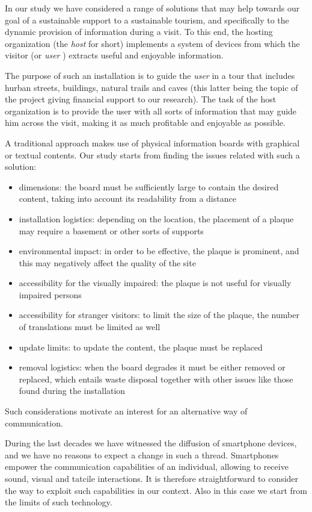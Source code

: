 \documentclass[sustainability,article,submit,pdftex,moreauthors]{Definitions/mdpi}
\begin{document}
In our study we have considered a range of solutions that may help towards our goal of a sustainable support to a sustainable tourism, and specifically to the dynamic provision of information during a visit. To this end, the hosting organization (the {\em host} for short) implements a system of devices from which the visitor (or {\em user} ) extracts useful and enjoyable information. 

The purpose of such an installation is to guide the {\em user} in a tour that includes hurban streets, buildings, natural trails and caves (this latter being the topic of the project giving financial support to our research). The task of the host organization is to provide the user with all sorts of information that may guide him across the visit, making it as much profitable and enjoyable as possible.

A traditional approach makes use of physical information boards with graphical or textual contents. Our study starts from finding the issues related with such a solution:

\begin{itemize}
\item dimensions: the board must be sufficiently large to contain the desired content, taking into account its readability from a distance
\item installation logistics: depending on the location, the placement of a plaque may require a basement or other sorts of supports
\item environmental impact: in order to be effective, the plaque is prominent, and this may negatively affect the quality of the site 
\item accessibility for the visually impaired: the plaque is not useful for visually impaired persons
\item accessibility for stranger visitors: to limit the size of the plaque, the number of translations must be limited as well
\item update limits: to update the content, the plaque must be replaced
\item removal logistics: when the board degrades it must be either removed or replaced, which entails waste disposal together with other issues like those found during the installation
\end{itemize}

Such considerations motivate an interest for an alternative way of communication. 

During the last decades we have witnessed the diffusion of smartphone devices, and we have no reasons to expect a change in such a thread. Smartphones empower the communication capabilities of an individual, allowing to receive sound, visual and tatcile interactions. It is therefore straightforward to consider the way to exploit such capabilities in our context. Also in this case we start from the limits of such technology.
\end{document}
